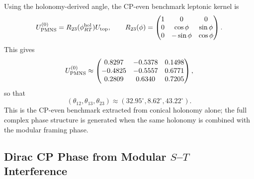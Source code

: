 \documentclass[11pt]{article}
\begin{document}
Using the holonomy-derived angle, the CP-even benchmark leptonic kernel is
\begin{equation}
 U_{\rm PMNS}^{(0)}=R_{23}(\phi_{RT}^{\rm hol})U_{\rm top},
 \qquad
 R_{23}(\phi)=
 \begin{pmatrix}
 1 & 0 & 0 \\
 0 & \cos\phi & \sin\phi \\
 0 & -\sin\phi & \cos\phi
 \end{pmatrix}.
\end{equation}
This gives
\begin{equation}
 U_{\rm PMNS}^{(0)}\approx
 \begin{pmatrix}
 0.8297 & -0.5378 & 0.1498 \\
 -0.4825 & -0.5557 & 0.6771 \\
 0.2809 & 0.6340 & 0.7205
 \end{pmatrix},
\end{equation}
so that
\begin{equation}
 \boxed{(\theta_{12},\theta_{13},\theta_{23})\approx(32.95^{\circ},8.62^{\circ},43.22^{\circ}).}
\end{equation}
This is the CP-even benchmark extracted from conical holonomy alone; the full complex phase structure is generated when the same holonomy is combined with the modular framing phase.

\subsection{Dirac CP Phase from Modular $S$--$T$ Interference}
\end{document}

